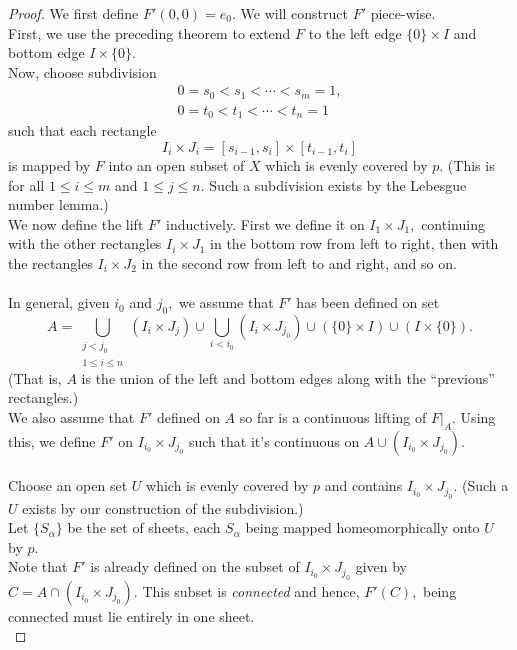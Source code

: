 \documentclass[12pt]{article}
\theoremstyle{definition}
\numberwithin{thm}{section}
\begin{document}
\begin{proof} 
	We first define $F'(0, 0) = e_0.$ We will construct $F'$ piece-wise.\\
	First, we use the preceding theorem to extend $F$ to the left edge $\{0\} \times I$ and bottom edge $I \times \{0\}.$ \\
	Now, choose subdivision
	\begin{align*} 
		0 = s_0 < s_1 < \cdots < s_m = 1,\\
		0 = t_0 < t_1 < \cdots < t_n = 1
	\end{align*}
	such that each rectangle 
	\begin{equation*} 
		I_i \times J_i = [s_{i - 1}, s_i] \times [t_{i - 1}, t_i] 
	\end{equation*}
	is mapped by $F$ into an open subset of $X$ which is evenly covered by $p.$ (This is for all $1 \le i \le m$ and $1 \le j \le n.$ Such a subdivision exists by the Lebesgue number lemma.)\\
	We now define the lift $F'$ inductively. First we define it on $I_1 \times J_1,$ continuing with the other rectangles $I_i \times J_1$ in the bottom row from left to right, then with the rectangles $I_i \times J_2$ in the second row from left to and right, and so on.\\~\\
	In general, given $i_0$ and $j_0,$ we assume that $F'$ has been defined on set
	\begin{equation*} 
		A = \bigcup_{\substack{j < j_0\\1 \le i \le n}}(I_i \times J_j) \cup \bigcup_{i < i_0}(I_i \times J_{j_0}) \cup \left(\{0\} \times I\right) \cup \left(I \times \{0\}\right).
	\end{equation*}
	(That is, $A$ is the union of the left and bottom edges along with the ``previous'' rectangles.)\\
	We also assume that $F'$ defined on $A$ so far is a continuous lifting of $F|_A.$ Using this, we define $F'$ on $I_{i_0} \times J_{j_0}$ such that it's continuous on $A \cup (I_{i_0} \times J_{j_0}).$\\~\\
	Choose an open set $U$ which is evenly covered by $p$ and contains $I_{i_0} \times J_{j_0}.$ (Such a $U$ exists by our construction of the subdivision.)\\
	Let $\{S_\alpha\}$ be the set of sheets, each $S_\alpha$ being mapped homeomorphically onto $U$ by $p.$\\
	Note that $F'$ is already defined on the subset of $I_{i_0} \times J_{j_0}$ given by $C = A \cap (I_{i_0} \times J_{j_0}).$ This subset is \emph{connected} and hence, $F'(C),$ being connected must lie entirely in one sheet.\\

\end{proof}
\end{document}
